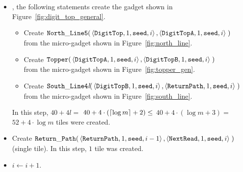 \begin{itemize}
    \item {\dtop}, the following statements create the gadget shown in Figure~\ref{fig:digit_top_general}.
    \begin{itemize}
        \item Create
        $\begin{aligned}[t]
            {\tt North\_Line5}(& \left \langle {\tt DigitTop},  1, {\tt seed}, i \right\rangle,
                                 \left \langle {\tt DigitTopA}, 1, {\tt seed}, i \right\rangle \;)
        \end{aligned}$\\ from the micro-gadget shown in Figure~\ref{fig:north_line}.

        \item Create
        $\begin{aligned}[t]
            {\tt Topper}(& \left\langle {\tt DigitTopA}, 1, {\tt seed}, i \right\rangle,
                           \left\langle {\tt DigitTopB}, 1, {\tt seed}, i \right\rangle \;)
        \end{aligned}$\\ from the micro-gadget shown in Figure~\ref{fig:topper_gen}.

        \item Create
        $\begin{aligned}[t]
            {\tt South\_Line4\textit{l}}(& \left\langle {\tt DigitTopB},  1, {\tt seed}, i\right\rangle,
                                           \left\langle {\tt ReturnPath}, 1, {\tt seed}, i\right\rangle \;)
        \end{aligned}$\\ from the micro-gadget shown in Figure~\ref{fig:south_line}.
    \end{itemize}
    In this step, $40 + 4l =$
    $40 + 4 \cdot \left( \ceil*{\log m} + 2 \right) \leq$
    $40 + 4 \cdot \left( {\log m} + 3 \right) =$
    $52 + 4 \cdot {\log m}$ tiles were created.

    \item Create
    $\begin{aligned}[t]
            \returnpath(&\left\langle {\tt ReturnPath}, 1, {\tt seed}, i - 1\right\rangle,
                         \left\langle {\tt NextRead},   1, {\tt seed}, i    \right\rangle \;)
    \end{aligned}$\\ (single tile).
    In this step, $1$ tile was created.

    \item $i \gets i + 1$.


\end{itemize}
